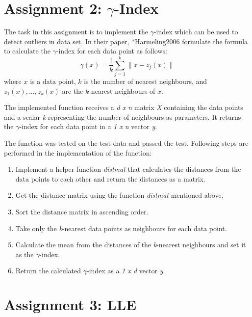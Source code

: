 \section{Assignment 2: $\gamma$-Index}
\label{sec:assignment2}

The task in this assignment is to implement the $\gamma$-index which can be used to detect outliers in data set. In their paper, \citeasnoun**{Harmeling2006} formulate the formula to calculate the $\gamma$-index for each data point as follows:
\begin{equation}
	\gamma(x)=\frac{1}{k} \sum_{j=1}^{k} \| x-z_j(x) \|
\end{equation}
where $x$ is a data point, $k$ is the number of nearest neighbours, and $z_1(x),...,z_k(x)$ are the $k$ nearest neighbours of $x$.

The implemented function receives a \textit{d x n} matrix \textit{X} containing the data points and a scalar \textit{k} representing the number of neighbours as parameters. It returns the $\gamma$-index for each data point in a \textit{1 x n} vector \textit{y}.

The function was tested on the test data and passed the test. Following steps are performed in the implementation of the function:
\begin{enumerate}
	\item Implement a helper function \textit{distmat} that calculates the distances from the data points to each other and return the distances as a matrix.
	\item Get the distance matrix using the function \textit{distmat} mentioned above.
	\item Sort the distance matrix in ascending order.
	\item Take only the \textit{k}-nearest data points as neighbours for each data point.
	\item Calculate the mean from the distances of the \textit{k}-nearest neighbours and set it as the $\gamma$-index.
	\item Return the calculated $\gamma$-index as a \textit{1 x d} vector \textit{y}.
	
\end{enumerate}


\section{Assignment 3: LLE}
\label{sec:assignment3}

